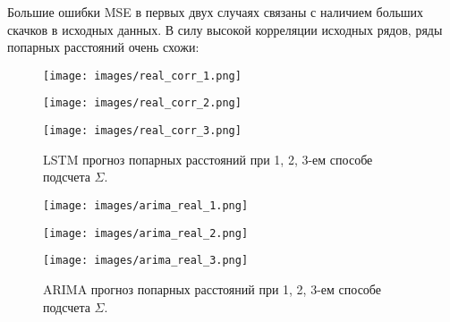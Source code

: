 \documentclass{article}
\begin{document}
Большие ошибки MSE в первых двух случаях связаны с наличием больших скачков в исходных данных. В силу высокой корреляции исходных рядов, ряды попарных расстояний очень схожи:

\newpage

\begin{figure}[h]
  \begin{minipage}{0.33\textwidth}
    \centering
    \texttt{[image: images/real\_corr\_1.png]}
  \end{minipage}\hfill
  \begin{minipage}{0.33\textwidth}
    \centering
    \texttt{[image: images/real\_corr\_2.png]}
  \end{minipage}\hfill
  \begin{minipage}{0.33\textwidth}
    \centering
    \texttt{[image: images/real\_corr\_3.png]}
  \end{minipage}\hfill
      \caption{LSTM прогноз попарных расстояний при 1, 2, 3-ем способе подсчета $\Sigma$.}
\end{figure}

\begin{figure}[h]
  \begin{minipage}{0.33\textwidth}
    \centering
    \texttt{[image: images/arima\_real\_1.png]}
  \end{minipage}\hfill
  \begin{minipage}{0.33\textwidth}
    \centering
    \texttt{[image: images/arima\_real\_2.png]}
  \end{minipage}\hfill
  \begin{minipage}{0.33\textwidth}
    \centering
    \texttt{[image: images/arima\_real\_3.png]}
  \end{minipage}\hfill
      \caption{ARIMA прогноз попарных расстояний при 1, 2, 3-ем способе подсчета $\Sigma$.}
\end{figure}
\end{document}
